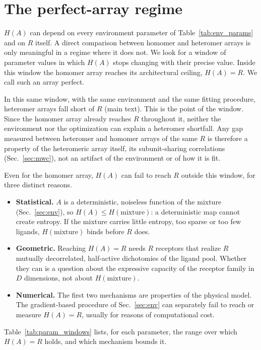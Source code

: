 \documentclass[aps,pre,superscriptaddress,floatfix,longbibliography]{revtex4-2}
\begin{document}
\section{The perfect-array regime}
\label{sec:perfect}

$H(A)$ can depend on every environment parameter of Table~\ref{tab:env_params}
and on $R$ itself. A direct comparison between homomer and heteromer arrays
is only meaningful in a regime where it does not. We look for a window of
parameter values in which $H(A)$ stops changing with their precise value.
Inside this window the homomer array reaches its architectural ceiling,
$H(A)=R$. We call such an array perfect.

In this same window, with the same environment and the same fitting
procedure, heteromer arrays fall short of $R$ (main text). This is the
point of the window. Since the homomer array already reaches $R$ throughout
it, neither the environment nor the optimization can explain a heteromer
shortfall. Any gap measured between heteromer and homomer arrays of the
same $R$ is therefore a property of the heteromeric array itself, its
subunit-sharing correlations (Sec.~\ref{sec:mwc}), not an artifact of the
environment or of how it is fit.

Even for the homomer array, $H(A)$ can fail to reach $R$ outside this
window, for three distinct reasons.

\begin{itemize}
\item \textbf{Statistical.} $A$ is a deterministic, noiseless function of
the mixture (Sec.~\ref{sec:env}), so $H(A)\le H(\text{mixture})$: a
deterministic map cannot create entropy. If the mixture carries little
entropy, too sparse or too few ligands, $H(\text{mixture})$ binds before
$R$ does.
\item \textbf{Geometric.} Reaching $H(A)=R$ needs $R$ receptors that
realize $R$ mutually decorrelated, half-active dichotomies of the ligand
pool. Whether they can is a question about the expressive capacity of the
receptor family in $D$ dimensions, not about $H(\text{mixture})$.
\item \textbf{Numerical.} The first two mechanisms are properties of the
physical model. The gradient-based procedure of Sec.~\ref{sec:env} can
separately fail to reach or measure $H(A)=R$, usually for reasons of
computational cost.
\end{itemize}

Table~\ref{tab:param_windows} lists, for each parameter, the range over
which $H(A)=R$ holds, and which mechanism bounds it.
\end{document}
